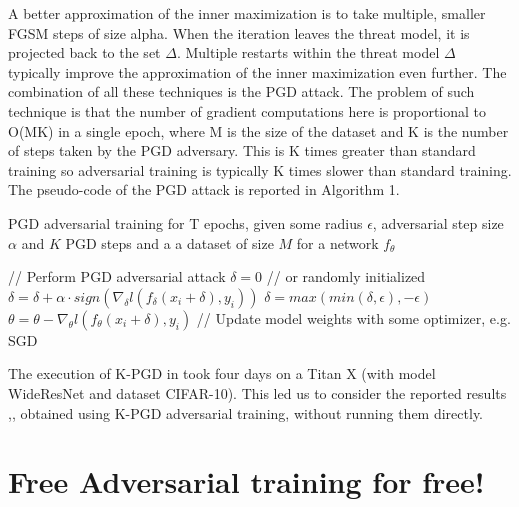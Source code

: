 \documentclass{article}
\begin{document}
A better approximation of the inner maximization is to take multiple, smaller FGSM steps of size alpha. When the iteration leaves the threat model, it is projected back to the set $\Delta$. Multiple restarts within the threat model $\Delta$ typically improve the approximation of the inner maximization even further. The combination of all these techniques is the PGD attack. The problem of such technique is that the number of gradient computations here is proportional to O(MK) in a single epoch, where M is the size of the dataset and K is the number of steps taken by the PGD adversary. This is K times greater than standard training so adversarial training is typically K times slower than standard training. The pseudo-code of the PGD attack is reported in Algorithm 1.
\begin{algorithm}[H]
	\caption{PGD adversarial training for T epochs, given some radius $\epsilon$, adversarial step size $\alpha$ and $K$ PGD steps and a a dataset of size $M$ for a network $f_{\theta}$}
	\begin{algorithmic}[1]
		\State// Perform PGD adversarial attack
		\State $\delta = 0$ // or randomly initialized
		\State $\delta = \delta + \alpha\cdot sign(\nabla_{\delta}l(f_{\delta}(x_i + \delta), y_i))$
		\State $\delta = max(min(\delta, \epsilon), -\epsilon)$
		\EndFor
		\State$\theta = \theta - \nabla_{\theta}l(f_{\theta}(x_i + \delta), y_i)$ // Update model weights with some optimizer, e.g. SGD
		\EndFor
		\EndFor
	\end{algorithmic}
\end{algorithm}
The execution of K-PGD in \cite{MadryEtAl2017} took four days on a Titan X (with model WideResNet and dataset CIFAR-10). This led us to consider the reported results \cite{ShafahiEtAl2019b},\cite{WongEtAl2020}, obtained using K-PGD adversarial training, without running them directly.

\section{Free Adversarial training for free!}
\end{document}
